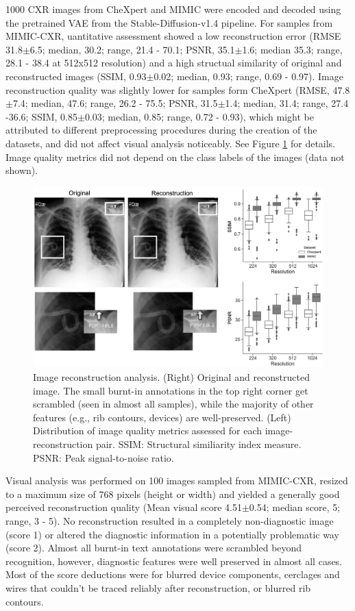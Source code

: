 \documentclass{article}
\begin{document}
1000 CXR images from CheXpert and MIMIC were encoded and decoded using the pretrained VAE from the Stable-Diffusion-v1.4 pipeline. For samples from MIMIC-CXR, uantitative assessment showed a low reconstruction error (RMSE	31.8$\pm$6.5; median, 30.2; range, 21.4 - 70.1; PSNR, 35.1$\pm$1.6; median 35.3; range, 28.1 - 38.4 at 512x512 resolution) and a high structual similarity of original and reconstructed images (SSIM, 0.93$\pm$0.02; median, 0.93; range, 0.69 - 0.97). Image reconstruction quality was slightly lower for samples form CheXpert (RMSE, 47.8$\pm$7.4; median, 47.6; range, 26.2 - 75.5; PSNR, 31.5$\pm$1.4; median, 31.4; range, 27.4 -36.6; SSIM, 0.85$\pm$0.03; median, 0.85; range, 0.72 - 0.93), which might be attributed to different preprocessing procedures during the creation of the datasets, and did not affect visual analysis noticeably. See Figure \ref{figure-image-quality} for details. Image quality metrics did not depend on the class labels of the images (data not shown). 

\begin{figure}[hbt!]
  \centering
    \includegraphics[width=135mm]{image_quality.png}
  \caption{Image reconstruction analysis. (Right) Original and reconstructed image. The small burnt-in annotations in the top right corner get scrambled (seen in almost all samples), while the majority of other features (e.g., rib contours, devices) are well-preserved. (Left) Distribution of image quality metrics assessed for each image-reconstruction pair. SSIM: Structural similiarity index measure. PSNR: Peak signal-to-noise ratio.}
  \label{figure-image-quality}
\end{figure}


Visual analysis was performed on 100 images sampled from MIMIC-CXR, resized to a maximum size of 768 pixels (height or width) and yielded a generally good perceived reconstruction quality (Mean visual score 4.51$\pm$0.54; median score, 5; range, 3 - 5). No reconstruction resulted in a completely non-diagnostic image (score 1) or altered the diagnostic information in a potentially problematic way (score 2). Almost all burnt-in text annotations were scrambled beyond recognition, however, diagnostic features were well preserved in almost all cases. Most of the score deductions were for blurred device components, cerclages and wires that couldn't be traced reliably after reconstruction, or blurred rib contours.
\end{document}
